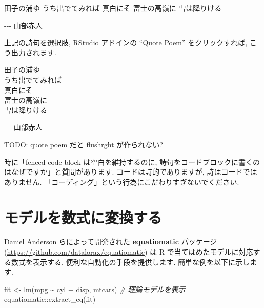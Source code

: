 \documentclass[
  11pt,
]{bxjsreport}
\newenvironment{Shaded}{\begin{snugshade}}{\end{snugshade}}
\newcommand{\CommentTok}[1]{\textcolor[rgb]{0.56,0.35,0.01}{\textit{#1}}}
\newcommand{\FunctionTok}[1]{\textcolor[rgb]{0.00,0.00,0.00}{#1}}
\newcommand{\NormalTok}[1]{#1}
\newcommand{\OtherTok}[1]{\textcolor[rgb]{0.56,0.35,0.01}{#1}}
\newcommand{\SpecialCharTok}[1]{\textcolor[rgb]{0.00,0.00,0.00}{#1}}
\renewenvironment{quote}{\begin{VF}}{\end{VF}}
\renewenvironment{quote}{\def\FrameCommand{{\color{quotebarcolor}{\vrule width 3pt}}\hspace{10pt}}\MakeFramed{\advance\hsize-\width\FrameRestore}}{\endMakeFramed}
\begin{document}
\begin{Shaded}
\begin{Highlighting}[]
\NormalTok{田子の浦ゆ}
\NormalTok{うち出でてみれば}
\NormalTok{真白にそ}
\NormalTok{富士の高嶺に}
\NormalTok{雪は降りける}

\NormalTok{{-}{-}{-} 山部赤人}
\end{Highlighting}
\end{Shaded}

上記の詩句を選択肢, RStudio アドインの ``Quote Poem'' をクリックすれば, こう出力されます.

\begin{quote}
田子の浦ゆ\\
うち出でてみれば\\
真白にそ\\
富士の高嶺に\\
雪は降りける

\begin{flushright}
--- 山部赤人

\end{flushright}
\end{quote}

TODO: quote poem だと flushrght が作られない?

時に「fenced code block は空白を維持するのに, 詩句をコードブロックに書くのはなぜですか」と質問があります. コードは詩的でありますが, 詩はコードではありません. 「コーディング」という行為にこだわりすぎないでください.

\hypertarget{equatiomatic}{%
\section{モデルを数式に変換する}\label{equatiomatic}}

Daniel Anderson らによって開発された \textbf{equatiomatic} パッケージ \autocite{R-equatiomatic} (\url{https://github.com/datalorax/equatiomatic}) は R で当てはめたモデルに対応する数式を表示する, 便利な自動化の手段を提供します. 簡単な例を以下に示します.

\begin{Shaded}
\begin{Highlighting}[numbers=left,,]
\NormalTok{fit }\OtherTok{\textless{}{-}} \FunctionTok{lm}\NormalTok{(mpg }\SpecialCharTok{\textasciitilde{}}\NormalTok{ cyl }\SpecialCharTok{+}\NormalTok{ disp, mtcars)}
\CommentTok{\# 理論モデルを表示}
\NormalTok{equatiomatic}\SpecialCharTok{::}\FunctionTok{extract\_eq}\NormalTok{(fit)}
\end{Highlighting}
\end{Shaded}
\end{document}
